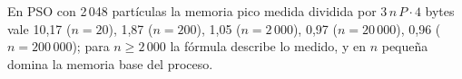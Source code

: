 En PSO con 2\,048 partículas la memoria pico medida dividida por $3\,n\,P\cdot4$ bytes vale 10,17 ($n=20$), 1,87 ($n=200$), 1,05 ($n=2\,000$), 0,97 ($n=20\,000$), 0,96 ($n=200\,000$); para $n\ge 2\,000$ la fórmula describe lo medido, y en $n$ pequeña domina la memoria base del proceso.
